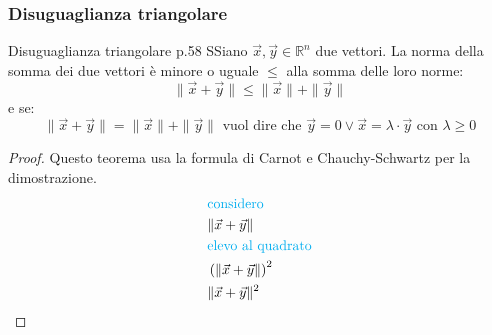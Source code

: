 \documentclass{article}  %
\begin{document}
\subsubsection{Disuguaglianza triangolare}
\begin{theorem}{Disuguaglianza triangolare p.58}
	SSiano $\vec{x}, \vec{y} \in \mathbb{R}^n$ due vettori. La norma della somma dei due vettori è minore o uguale $\leq$ alla somma delle loro norme:
	\[
		\|\vec{x}+\vec{y}\| \leq \|\vec{x}\| + \|\vec{y}\|
	\]
	e se:
	\[
		\|\vec{x}+\vec{y}\| = \|\vec{x}\| + \|\vec{y}\| \text{ vuol dire che } \vec{y}=0 \lor \vec{x}=\lambda \cdot \vec{y} \text{ con } \lambda \geq 0
	\]
	\begin{proof}
		Questo teorema usa la formula di Carnot e Chauchy-Schwartz per la dimostrazione. \\
		\begin{align*}
			 & \textcolor{cyan}{\text{considero}}                                                                                                                                                                                                                                                                                                                                                 \\
			 & \|\vec{x}+\vec{y}\|                                                                                                                                                                                                                                                                                                                                                                \\
			 & \textcolor{cyan}{\text{elevo al quadrato}}                                                                                                                                                                                                                                                                                                                                         \\
			 & \left(\|\vec{x}+\vec{y}\| \right)^2                                                                                                                                                                                                                                                                                                                                                \\
			 & \|\vec{x}+\vec{y}\|^2                                                                                                                                                                                                                                                                                                                                                              \\

\end{align*}
\end{proof}
\end{theorem}
\end{document}
